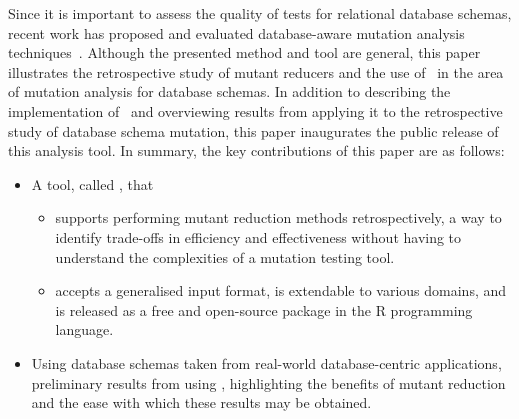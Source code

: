 
Since it is important to assess the quality of tests for relational database schemas, recent work has proposed and
evaluated database-aware mutation analysis techniques~\cite{mcminn2016virtual, mcminn2015effectiveness,
wright2013efficient}. Although the presented method and tool are general, this paper illustrates the retrospective study
of mutant reducers and the use of \mr~in the area of mutation analysis for database schemas. In addition to describing
the implementation of \mr~and overviewing results from applying it to the retrospective study of database schema
mutation, this paper inaugurates the public release of this analysis tool. In summary, the key contributions of this
paper are as follows:

\begin{itemize}





  \item A tool, called \mr, that

      \begin{itemize}
          \item supports performing mutant reduction methods retrospectively, a way to identify trade-offs
            in efficiency and effectiveness without having to understand the complexities of a mutation testing tool.

          \item accepts a generalised input format, is extendable to various domains, and is released as a free and open-source package in
            the R programming language.

    \end{itemize}


  \item Using database schemas taken from real-world database-centric applications, preliminary results from using
    \mr, highlighting the benefits of mutant reduction and the ease with which these results may be obtained.

\end{itemize}



